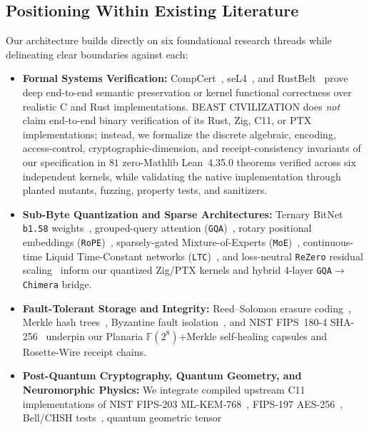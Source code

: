 \documentclass[11pt,letterpaper]{amsart}
\newcommand{\code}[1]{{\small\texttt{#1}}}
\newcommand{\GF}{\mathbb{F}}
\begin{document}
\subsection{Positioning Within Existing Literature}
Our architecture builds directly on six foundational research threads while
delineating clear boundaries against each:
\begin{itemize}
  \item \textbf{Formal Systems Verification:} CompCert~\cite{leroy2009compcert},
  seL4~\cite{klein2009sel4}, and RustBelt~\cite{jung2018rustbelt} prove deep
  end-to-end semantic preservation or kernel functional correctness over realistic
  C and Rust implementations. \textsc{BEAST CIVILIZATION} does \emph{not} claim
  end-to-end binary verification of its Rust, Zig, C11, or PTX implementations;
  instead, we formalize the discrete algebraic, encoding, access-control,
  cryptographic-dimension, and receipt-consistency invariants of our specification
  in $81$ zero-Mathlib Lean~4.35.0 theorems verified across six independent
  kernels, while validating the native implementation through planted mutants,
  fuzzing, property tests, and sanitizers.
  \item \textbf{Sub-Byte Quantization and Sparse Architectures:} Ternary BitNet
  \code{b1.58} weights~\cite{ma2024era}, grouped-query attention
  (\code{GQA})~\cite{ainslie2023gqa}, rotary positional embeddings
  (\code{RoPE})~\cite{su2024roformer}, sparsely-gated Mixture-of-Experts
  (\code{MoE})~\cite{shazeer2017outrageously,fedus2022switch}, continuous-time
  Liquid Time-Constant networks (\code{LTC})~\cite{hasani2021liquid}, and
  loss-neutral \code{ReZero} residual scaling~\cite{bachlechner2021rezero} inform
  our quantized Zig/PTX kernels and hybrid 4-layer \code{GQA}$\to$\code{Chimera}
  bridge.
  \item \textbf{Fault-Tolerant Storage and Integrity:} Reed--Solomon erasure
  coding~\cite{reed1960polynomial,plank1997tutorial}, Merkle hash
  trees~\cite{merkle1988digital}, Byzantine fault
  isolation~\cite{lamport1982byzantine}, and NIST FIPS~180-4
  SHA-256~\cite{nist2015fips180} underpin our Planaria $\GF(2^8)$+Merkle
  self-healing capsules and Rosette-Wire receipt chains.
  \item \textbf{Post-Quantum Cryptography, Quantum Geometry, and Neuromorphic Physics:}
  We integrate compiled upstream C11 implementations of NIST FIPS-203
  ML-KEM-768~\cite{nist2024fips203}, FIPS-197 AES-256~\cite{nist2001fips197},
  Bell/CHSH tests~\cite{bell1964epr,clauser1969proposed}, quantum geometric tensor

\end{itemize}
\end{document}
